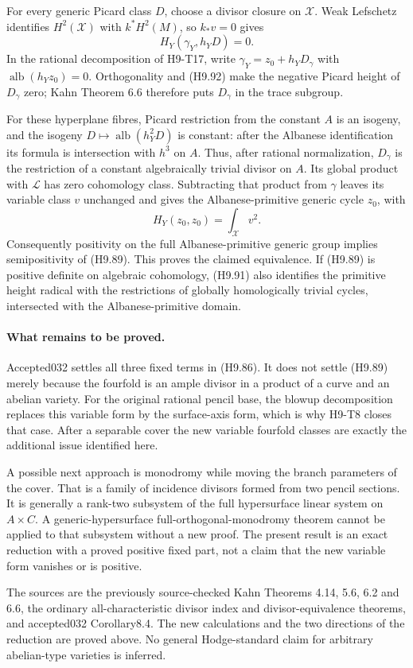 For every generic Picard class $D$, choose a divisor closure on
$\mathcal X$. Weak Lefschetz identifies $H^2(\mathcal X)$ with
$k^*H^2(M)$, so $k_*v=0$ gives
\[
                         H_Y(\gamma_Y,h_YD)=0.              \tag{H9.92}
\]
In the rational decomposition of H9-T17, write
$\gamma_Y=z_0+h_YD_\gamma$ with
$\operatorname{alb}(h_Yz_0)=0$. Orthogonality and (H9.92) make
the negative Picard height of $D_\gamma$ zero; Kahn Theorem 6.6
therefore puts $D_\gamma$ in the trace subgroup.

For these hyperplane fibres, Picard restriction from the constant
$A$ is an isogeny, and the isogeny
$D\mapsto\operatorname{alb}(h_Y^2D)$ is constant: after the
Albanese identification its formula is intersection with $h^3$
on $A$. Thus, after rational normalization, $D_\gamma$ is the
restriction of a constant algebraically trivial divisor on $A$.
Its global product with $\mathcal L$ has zero cohomology class.
Subtracting that product from $\gamma$ leaves its variable class
$v$ unchanged and gives the Albanese-primitive generic cycle
$z_0$, with
\[
                          H_Y(z_0,z_0)=\int_{\mathcal X}v^2.
\]
Consequently positivity on the full Albanese-primitive generic
group implies semipositivity of (H9.89). This proves the claimed
equivalence. If (H9.89) is positive definite on algebraic
cohomology, (H9.91) also identifies the primitive height radical
with the restrictions of globally homologically trivial cycles,
intersected with the Albanese-primitive domain.

\paragraph{What remains to be proved.}
Accepted032 settles all three fixed terms in (H9.86). It does
not settle (H9.89) merely because the fourfold is an ample divisor
in a product of a curve and an abelian variety. For the original
rational pencil base, the blowup decomposition replaces this
variable form by the surface-axis form, which is why H9-T8 closes
that case. After a separable cover the new variable fourfold
classes are exactly the additional issue identified here.

A possible next approach is monodromy while moving the branch
parameters of the cover. That is a family of incidence divisors
formed from two pencil sections. It is generally a rank-two
subsystem of the full hypersurface linear system on $A\times C$.
A generic-hypersurface full-orthogonal-monodromy theorem cannot
be applied to that subsystem without a new proof. The present
result is an exact reduction with a proved positive fixed part,
not a claim that the new variable form vanishes or is positive.

The sources are the previously source-checked Kahn Theorems 4.14,
5.6, 6.2 and 6.6, the ordinary all-characteristic divisor index
and divisor-equivalence theorems, and accepted032 Corollary8.4.
The new calculations and the two directions of the reduction are
proved above. No general Hodge-standard claim for arbitrary
abelian-type varieties is inferred.

